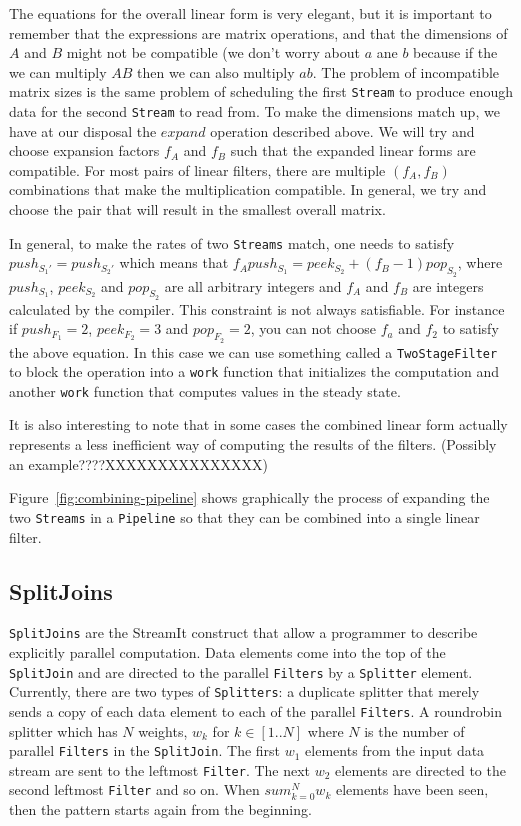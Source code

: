 The equations for the overall linear form is very elegant, but it is important to 
remember that the expressions are matrix operations, and that the dimensions of 
$A$ and $B$ might not be compatible (we don't worry about $a$ ane $b$ because if the 
we can multiply $AB$ then we can also multiply $ab$. The problem of incompatible
matrix sizes is the same problem of scheduling the first {\tt Stream} to produce
enough data for the second {\tt Stream} to read from. To make the dimensions match up, 
we have at our disposal the $expand$ operation described above. We will try and 
choose expansion factors $f_A$ and $f_B$ such that the expanded linear forms are
compatible. For most pairs of linear filters, there are multiple $(f_A,f_B)$ combinations
that make the multiplication compatible. In general, we try and choose the pair that
will result in the smallest overall matrix.


In general, to make the rates of two {\tt Streams} match, one needs to satisfy
$push_{S_1'} = push_{S_2'}$ which means that 
$f_Apush_{S_1}=peek_{S_2}+(f_B-1)pop_{S_2}$, where $push_{S_1}$,
$peek_{S_2}$ and $pop_{S_2}$ are all arbitrary integers and 
$f_A$ and $f_B$ are integers calculated by the compiler.
This constraint is not always satisfiable. For instance if
$push_{F_1}=2$, $peek_{F_2}=3$ and $pop_{F_2}=2$, you can not
choose $f_a$ and $f_2$ to satisfy the above equation. In this 
case we can use something called a {\tt TwoStageFilter} to block
the operation into a {\tt work} function that initializes the 
computation and another {\tt work} function that computes values
in the steady state.

It is also interesting to note that in some cases the combined linear form
actually represents a less inefficient way of computing the results of the
filters. (Possibly an example????XXXXXXXXXXXXXXX)

Figure~\ref{fig:combining-pipeline} shows graphically the process of expanding the
two {\tt Streams} in a {\tt Pipeline} so that they can be combined into a single linear filter.

\subsection{SplitJoins}
{\tt SplitJoins} are the StreamIt construct that allow a programmer to describe explicitly 
parallel computation. Data elements come into the top of the {\tt SplitJoin} and are directed
to the parallel {\tt Filters} by a {\tt Splitter} element. Currently, there are two types of
{\tt Splitters}: a duplicate splitter that merely sends a copy of each data element to each
of the parallel {\tt Filters}. A roundrobin splitter which has $N$ weights, $w_k$ for $k\in[1..N]$
where $N$ is the number of parallel {\tt Filters} in the {\tt SplitJoin}. The first $w_1$ elements
from the input data stream are sent to the leftmost {\tt Filter}. The next $w_2$ elements
are directed to the second leftmost {\tt Filter} and so on. When $sum_{k=0}^{N} w_k$ elements
have been seen, then the pattern starts again from the beginning.

